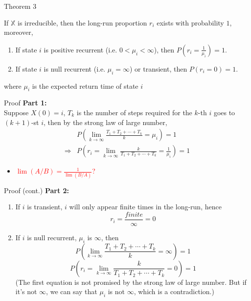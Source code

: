 \documentclass[mathserif]{beamer}
\begin{document}
\begin{frame}{Theorem 3}\label{pro_value}
	\begin{theorem}
	If $\mathbb{X}$ is irreducible, then the long-run proportion $r_i$ exists with probability $1$, moreover,
	\begin{enumerate}
	\item If state $i$ is positive recurrent (i.e. $0 < \mu_i < \infty$), then $P(r_i = \frac{1}{\mu_i}) = 1$.
	\item If state $i$ is null recurrent (i.e. $\mu_i = \infty$) or transient, then $P(r_i = 0) = 1$.
	\end{enumerate}
	where $\mu_i$ is the expected return time of state $i$
	\end{theorem}
\end{frame}

\begin{frame}{Proof}
	\textbf{Part 1:} \\
	Suppose $X(0) = i$, $T_k$ is the number of steps required for the $k$-th $i$ goes to $(k+1)$-st $i$,
	then by the strong law of large number,
	\begin{align*}
	&P\left( \lim_{k\to\infty} \frac{T_1 + T_2 + \cdots + T_k}{k} = \mu_i \right) = 1 \\
	\Rightarrow & P\left( r_i = \lim_{k\to\infty} \frac{k}{T_1 + T_2 + \cdots + T_k} = \frac{1}{\mu_i} \right) = 1
	\end{align*}
	\begin{itemize}
	\item \textcolor{red}{$\lim (A/B) = \frac{1}{\lim (B/A)}$?}
	\end{itemize}
\end{frame}

\begin{frame}{Proof (cont.)}
	\textbf{Part 2:} \\
	\begin{enumerate}
	\item If $i$ is transient, $i$ will only appear finite times in the long-run, hence
		\[
		r_i = \frac{finite}{\infty} = 0
		\]
	\item If $i$ is null recurrent, $\mu_i$ is $\infty$, then
		\[
		P\left( \lim_{k\to\infty} \frac{T_1 + T_2 + \cdots + T_k}{k} = \infty \right) = 1
		\]
		\[
		P\left( r_i = \lim_{k\to\infty} \frac{k}{T_1 + T_2 + \cdots + T_k} = 0 \right) = 1
		\]
		(The first equation is not promised by the strong law of large number.
		But if it's not $\infty$, we can say that $\mu_i$ is not $\infty$, which is a contradiction.)
	\end{enumerate}
\end{frame}
\end{document}

